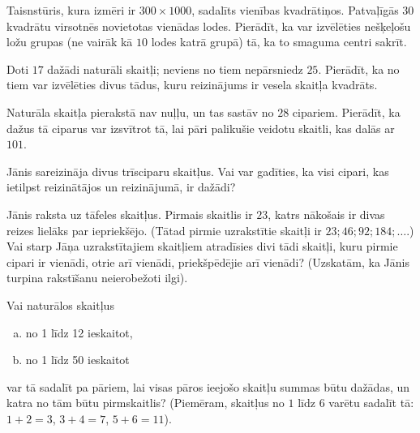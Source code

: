 \documentclass[a4paper,12pt]{article}
\begin{document}
\vspace{10pt}
\begin{problem}
Taisnstūris, kura izmēri ir $300 \times 1000$, 
sadalīts vienības kvadrātiņos. Patvaļīgās $30$ kvadrātu virsotnēs 
novietotas vienādas lodes. Pierādīt, ka var izvēlēties 
nešķeļošu ložu grupas (ne vairāk kā $10$ lodes katrā grupā) tā, 
ka to smaguma centri sakrīt.
\end{problem}



\vspace{10pt}
\begin{problem}
Doti $17$ dažādi naturāli skaitļi; neviens no tiem nepārsniedz $25$. 
Pierādīt, ka no tiem var izvēlēties divus tādus, 
kuru reizinājums ir vesela skaitļa kvadrāts.
\end{problem}



\vspace{10pt}
\begin{problem}
Naturāla skaitļa pierakstā nav nuļļu, un tas sastāv no $28$ cipariem.
Pierādīt, ka dažus tā ciparus var izsvītrot tā, lai pāri palikušie 
veidotu skaitli, kas dalās ar $101$.
\end{problem}
 
 
\vspace{10pt}
\begin{problem}
Jānis sareizināja divus trīsciparu skaitļus. Vai var gadīties, 
ka visi cipari, kas ietilpst reizinātājos un reizinājumā, ir dažādi?
\end{problem}



\vspace{10pt}
\begin{problem}
Jānis raksta uz tāfeles skaitļus. Pirmais skaitlis ir $23$, 
katrs nākošais ir divas reizes lielāks par iepriekšējo. 
(Tātad pirmie uzrakstītie skaitļi ir $23; 46; 92; 184;\ldots$.) 
Vai starp Jāņa uzrakstītajiem skaitļiem atradīsies divi tādi skaitļi, 
kuru pirmie cipari ir vienādi, otrie \textendash{} arī vienādi, 
priekšpēdējie \textendash{} arī vienādi? 
(Uzskatām, ka Jānis turpina rakstīšanu neierobežoti ilgi).
\end{problem}


\vspace{10pt}
\begin{problem}
Vai naturālos skaitļus
\begin{enumerate}[(a)]
\item no 1 līdz 12 ieskaitot,
\item no 1 līdz 50 ieskaitot
\end{enumerate}
var tā sadalīt pa pāriem, lai visas pāros ieejošo skaitļu summas 
būtu dažādas, un katra no tām būtu pirmskaitlis?
(Piemēram, skaitļus no $1$ līdz $6$ varētu sadalīt tā:  
$1+2 = 3$, $3+4 =7$, $5+6 = 11$).
\end{problem}
\end{document}
